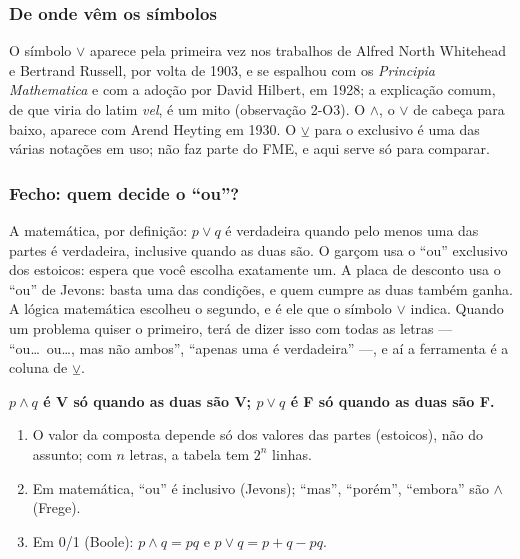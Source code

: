 \subsubsection{De onde vêm os símbolos}
O símbolo $\vee$ aparece pela primeira vez nos trabalhos de Alfred North Whitehead e Bertrand Russell, por volta de 1903, e se espalhou com os \emph{Principia Mathematica} e com a adoção por David Hilbert, em 1928; a explicação comum, de que viria do latim \emph{vel}, é um mito (observação 2-O3). O $\wedge$, o $\vee$ de cabeça para baixo, aparece com Arend Heyting em 1930. O $\veebar$ para o exclusivo é uma das várias notações em uso; não faz parte do FME, e aqui serve só para comparar.

\subsubsection{Fecho: quem decide o \enquote{ou}?}
A matemática, por definição: $p\vee q$ é verdadeira quando pelo menos uma das partes é verdadeira, inclusive quando as duas são. O garçom usa o \enquote{ou} exclusivo dos estoicos: espera que você escolha exatamente um. A placa de desconto usa o \enquote{ou} de Jevons: basta uma das condições, e quem cumpre as duas também ganha. A lógica matemática escolheu o segundo, e é ele que o símbolo $\vee$ indica. Quando um problema quiser o primeiro, terá de dizer isso com todas as letras — \enquote{ou\ldots\ ou\ldots, mas não ambos}, \enquote{apenas uma é verdadeira} —, e aí a ferramenta é a coluna de $\veebar$.

\begin{paralembrar}\label{lembrar-u2}
\textbf{$p\wedge q$ é V só quando as duas são V; $p\vee q$ é F só quando as duas são F.}
\begin{enumerate}[label=\arabic*.,leftmargin=1.4em]
  \item O valor da composta depende só dos valores das partes (estoicos), não do assunto; com $n$ letras, a tabela tem $2^n$ linhas.
  \item Em matemática, \enquote{ou} é inclusivo (Jevons); \enquote{mas}, \enquote{porém}, \enquote{embora} são $\wedge$ (Frege).
  \item Em 0/1 (Boole): $p\wedge q = pq$ e $p\vee q = p+q-pq$.
\end{enumerate}
\end{paralembrar}

\OndeEUsado

